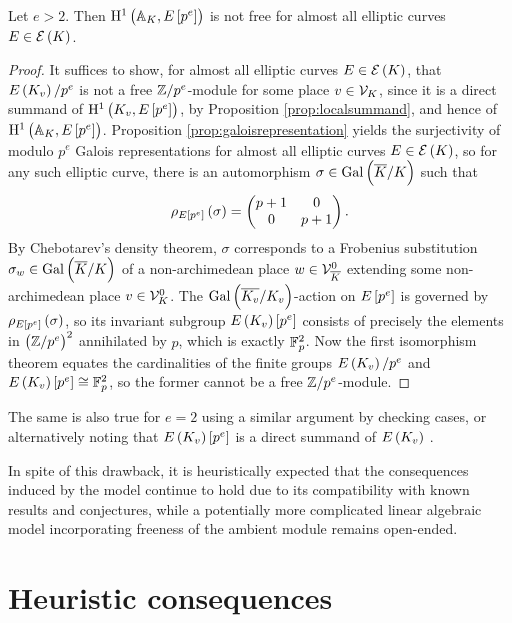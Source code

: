 \begin{proposition}
Let $ e > 2 $. Then $ \HE[p^e]{\AA_K} $ is not free for almost all elliptic curves $ E \in \EEE\br{K} $.
\end{proposition}

\begin{proof}
It suffices to show, for almost all elliptic curves $ E \in \EEE\br{K} $, that $ \En[p^e]{K_v} $ is not a free $ \mathbb{Z} / p^e $-module for some place $ v \in \mathcal{V}_K $, since it is a direct summand of $ \HE[p^e]{K_v} $, by Proposition \ref{prop:localsummand}, and hence of $ \HE[p^e]{\AA_K} $. Proposition \ref{prop:galoisrepresentation} yields the surjectivity of modulo $ p^e $ Galois representations for almost all elliptic curves $ E \in \EEE\br{K} $, so for any such elliptic curve, there is an automorphism $ \sigma \in \AG{K} $ such that
$$ \rho_{E\sbr{p^e}}\br{\sigma} = \twobytwo{p + 1}{0}{0}{p + 1}. $$
By Chebotarev's density theorem, $ \sigma $ corresponds to a Frobenius substitution $ \sigma_w \in \AG{K} $ of a non-archimedean place $ w \in \mathcal{V}_{\overline{K}}^0 $ extending some non-archimedean place $ v \in \mathcal{V}_K^0 $. The $ \AG{K_v} $-action on $ E\sbr{p^e} $ is governed by $ \rho_{E\sbr{p^e}}\br{\sigma} $, so its invariant subgroup $ E\br{K_v}\sbr{p^e} $ consists of precisely the elements in $ \br{\ZZ / p^e}^2 $ annihilated by $ p $, which is exactly $ \mathbb{F}_p^2 $. Now the first isomorphism theorem equates the cardinalities of the finite groups $ \En[p^e]{K_v} $ and $ E\br{K_v}\sbr{p^e} \cong \FF_p^2 $, so the former cannot be a free $ \mathbb{Z} / p^e $-module.
\end{proof}

\begin{remark}
The same is also true for $ e = 2 $ using a similar argument by checking cases, or alternatively noting that $ E\br{K_v}\sbr{p^e} $ is a direct summand of $ E\br{K_v} $ \cite[Proposition 6.13]{BKLPR15}.
\end{remark}

In spite of this drawback, it is heuristically expected that the consequences induced by the model continue to hold due to its compatibility with known results and conjectures, while a potentially more complicated linear algebraic model incorporating freeness of the ambient module remains open-ended.

\pagebreak

\chapter{Heuristic consequences}

